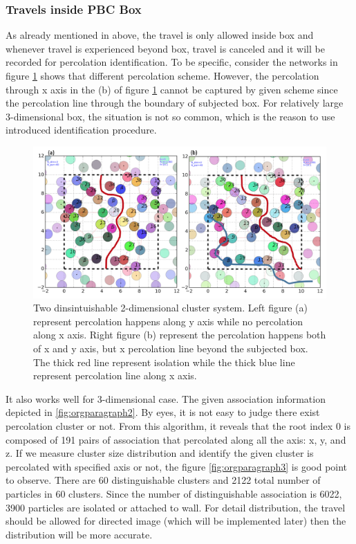 \documentclass[11pt]{article}
\begin{document}
\subsubsection{Travels inside PBC Box}
\label{sec:orgheadline9}
As already mentioned in above, the travel is only allowed inside box and whenever travel is experienced beyond box, travel is canceled and it will be recorded for percolation identification. To be specific, consider the networks in figure \ref{fig:orgparagraph1} shows that different percolation scheme. However, the percolation through x axis in the (b) of figure \ref{fig:orgparagraph1} cannot be captured by given scheme since the percolation line through the boundary of subjected box. For relatively large 3-dimensional box, the situation is not so common, which is the reason to use introduced identification procedure. 

\begin{figure}[htb]
\centering
\includegraphics[width=.9\linewidth]{data_structure/ex_percolation_identification.png}
\caption{\label{fig:orgparagraph1}
Two dinsintuishable 2-dimensional cluster system. Left figure (a) represent percolation happens along y axis while no percolation along x axis. Right figure (b) represent the percolation happens both of x and y axis, but x percolation line beyond the subjected box. The thick red line represent isolation while the thick blue line represent percolation line along x axis.}
\end{figure}

It also works well for 3-dimensional case. The given association information depicted in \ref{fig:orgparagraph2}. By eyes, it is not easy to judge there exist percolation cluster or not. From this algorithm, it reveals that the root index 0 is composed of 191 pairs of association that percolated along all the axis: x, y, and z. If we measure cluster size distribution and identify the given cluster is percolated with specified axis or not, the figure \ref{fig:orgparagraph3} is good point to observe. There are 60 distinguishable clusters and 2122 total number of particles in 60 clusters. Since the number of distinguishable association is 6022, 3900 particles are isolated or attached to wall. For detail distribution, the travel should be allowed for directed image (which will be implemented later) then the distribution will be more accurate.
\end{document}
